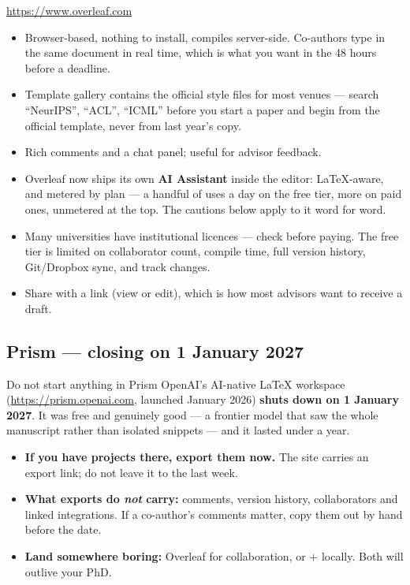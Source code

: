 \documentclass[11pt,a4paper]{article}
\begin{document}
\url{https://www.overleaf.com}

\begin{itemize}
  \item Browser-based, nothing to install, compiles server-side. Co-authors
        type in the same document in real time, which is what you want in the
        48 hours before a deadline.
  \item Template gallery contains the official style files for most venues
        --- search ``NeurIPS'', ``ACL'', ``ICML'' before you start a paper and
        begin from the official template, never from last year's copy.
  \item Rich comments and a chat panel; useful for advisor feedback.
  \item Overleaf now ships its own \textbf{AI Assistant} inside the editor:
        LaTeX-aware, and metered by plan --- a handful of uses a day on the
        free tier, more on paid ones, unmetered at the top. The cautions
        below apply to it word for word.
  \item Many universities have institutional licences --- check before paying.
        The free tier is limited on collaborator count, compile time, full
        version history, Git/Dropbox sync, and track changes.
  \item Share with a link (view or edit), which is how most advisors want to
        receive a draft.
\end{itemize}

\subsection{Prism --- closing on 1 January 2027}

\begin{wbox}{Do not start anything in Prism}
OpenAI's AI-native LaTeX workspace (\url{https://prism.openai.com}, launched
January 2026) \textbf{shuts down on 1 January 2027}. It was free and genuinely
good --- a frontier model that saw the whole manuscript rather than isolated
snippets --- and it lasted under a year.

\begin{itemize}
  \item \textbf{If you have projects there, export them now.} The site carries
        an export link; do not leave it to the last week.
  \item \textbf{What exports do \emph{not} carry:} comments, version history,
        collaborators and linked integrations. If a co-author's comments
        matter, copy them out by hand before the date.
  \item \textbf{Land somewhere boring:} Overleaf for collaboration, or
         +  locally. Both will outlive your PhD.
\end{itemize}
\end{wbox}
\end{document}
